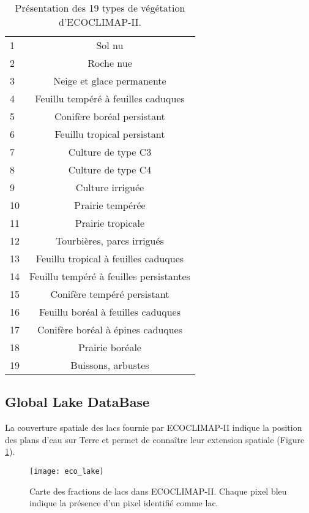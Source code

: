 \begin{table}[h!]
 \centering
 \caption{Présentation des 19 types de végétation d'ECOCLIMAP-II.}
 \label{eco_patch}
 \begin{tabularx}{0.75\textwidth}{Xc}
 \hline
 \hline
  1 & Sol nu\\
  2 & Roche nue\\
  3 & Neige et glace permanente\\
  4 & Feuillu tempéré à feuilles caduques\\
  5 & Conifère boréal persistant\\
  6 & Feuillu tropical persistant\\
  7 & Culture de type C3\\
  8 & Culture de type C4\\
  9 & Culture irriguée\\
  10 & Prairie tempérée\\
  11 & Prairie tropicale\\
  12 & Tourbières, parcs irrigués\\
  13 & Feuillu tropical à feuilles caduques\\
  14 & Feuillu tempéré à feuilles persistantes\\
  15 & Conifère tempéré persistant\\
  16 & Feuillu boréal à feuilles caduques \\
  17 & Conifère boréal à épines caduques\\
  18 & Prairie boréale\\
  19 & Buissons, arbustes \\
\hline
\hline
 \end{tabularx}
\end{table}

\clearpage

\subsection{{\selectfont Global Lake DataBase}}

La couverture spatiale des lacs fournie par ECOCLIMAP-II indique la position des plans d'eau sur Terre et permet de connaître leur extension spatiale (Figure \ref{eco_lake}). 

\begin{figure}[h!]
 \texttt{[image: eco\_lake]}
 \caption{Carte des fractions de lacs dans ECOCLIMAP-II. Chaque pixel bleu indique la présence d'un pixel identifié comme lac.}
 \label{eco_lake}
\end{figure}

